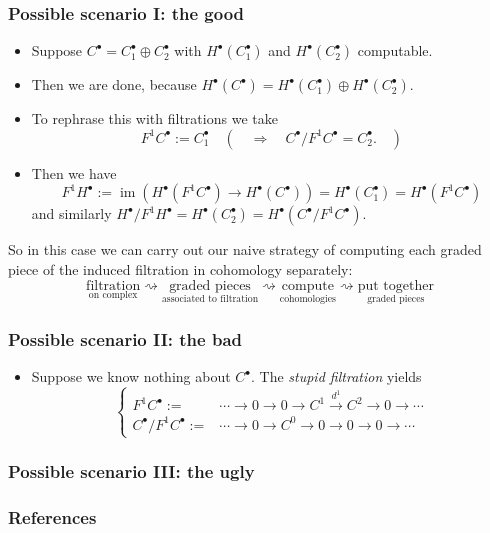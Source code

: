 \documentclass[notheorems, hyperref={backref}]{beamer}
\theoremstyle{darkgreentheorem}
\theoremstyle{darkbluedefinition}
\theoremstyle{darkredexample}
\theoremstyle{remark}
\DeclareMathOperator{\im}{im}
\newcommand{\op}{\oplus}
\begin{document}
\begin{frame}
    \frametitle{Possible scenario I: the good}
    \begin{itemize}
	\item Suppose $C^{\bullet}=C_{1}^{\bullet}\op C_{2}^{\bullet}$ with $H^{\bullet}(C_{1}^{\bullet})$ and $H^{\bullet}(C_{2}^{\bullet})$ computable.
	    \pause
	\item Then we are done, because $H^{\bullet}(C^{\bullet})=H^{\bullet}(C_{1}^{\bullet})\op H^{\bullet}(C_{2}^{\bullet})$.
	    \pause
	\item To rephrase this with filtrations we take
	    \vspace{-3mm}
	    \[ F^{1}C^{\bullet}:=C_{1}^{\bullet} \quad \left(\quad \Rightarrow \quad C^{\bullet}/F^{1}C^{\bullet}=C_{2}^{\bullet}. \quad \right) \]
	    \vspace{-8mm}
	    \pause
	\item Then we have
	    \[ F^{1}H^{\bullet}:=\im(H^{\bullet}(F^{1}C^{\bullet})\to H^{\bullet}(C^{\bullet}))=H^{\bullet}(C_{1}^{\bullet})=H^{\bullet}(F^{1}C^{\bullet}) \]
	    and similarly $H^{\bullet}/F^{1}H^{\bullet}=H^{\bullet}(C_{2}^{\bullet})=H^{\bullet}(C^{\bullet}/F^{1}C^{\bullet})$.
	    \pause
    \end{itemize}
    \vspace{2mm}
    So in this case we can carry out our naive strategy of computing each graded piece of the induced filtration in cohomology separately:
    \hspace{-10mm}
    \[ \boxed{\underset{\text{on complex}}{\text{filtration}}}\rightsquigarrow \boxed{\underset{\text{associated to filtration}}{\text{graded pieces}}} \rightsquigarrow \boxed{\underset{\text{cohomologies}}{\text{compute}}} \rightsquigarrow \boxed{\underset{{\text{graded pieces}}}{\text{put together}}} \]
\end{frame}

\begin{frame}
    \frametitle{Possible scenario II: the bad}
    \begin{itemize}
	\item Suppose we know nothing about $C^{\bullet}$.
	    The \textit{stupid filtration} yields
	    \[
	    \begin{cases}
		F^{1}C^{\bullet}:= & \cdots \to 0\to 0 \to C^{1}\xrightarrow{d^{1}} C^{2} \to 0 \to \cdots \\
		C^{\bullet}/F^{1}C^{\bullet}:= & \cdots \to 0 \to C^{0}\to 0 \to 0 \to 0 \to \cdots
	    \end{cases}
	    \]
    \end{itemize}
\end{frame}

\begin{frame}
    \frametitle{Possible scenario III: the ugly}
\end{frame}

\begin{frame}
    \frametitle{References}
    
    
\end{frame}
 
\end{document}
